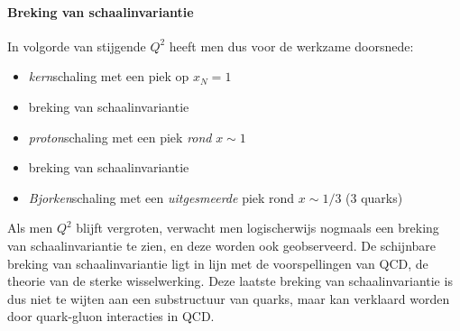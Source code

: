 \documentclass[a4paper,11pt]{article}
\numberwithin{equation}{section} %
\begin{document}
      \paragraph{Breking van schaalinvariantie}
In volgorde van stijgende $Q^2$ heeft men dus voor de werkzame doorsnede:
\begin{itemize}
  \item\textit{kern}schaling met een piek op $x_N=1$
  \item  breking van schaalinvariantie
  \item \textit{proton}schaling met een piek \textit{rond} $x \sim 1$
  \item breking van schaalinvariantie
  \item \textit{Bjorken}schaling met een \textit{uitgesmeerde} piek rond $x \sim 1/3$ (3 quarks)
\end{itemize}
Als men $Q^2$ blijft vergroten, verwacht men logischerwijs nogmaals een breking van schaalinvariantie te zien, en deze worden ook geobserveerd.
De schijnbare breking van schaalinvariantie ligt in lijn met de voorspellingen van QCD, de theorie van de sterke wisselwerking.
Deze laatste breking van schaalinvariantie is dus niet te wijten aan een substructuur van quarks, maar kan verklaard worden door quark-gluon interacties in QCD.
\end{document}
